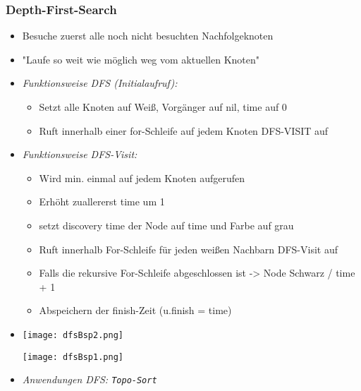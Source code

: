         \subsubsection{Depth-First-Search}
            \begin{itemize}
                \item Besuche zuerst alle noch nicht besuchten Nachfolgeknoten
                \item \string"Laufe so weit wie möglich weg vom aktuellen Knoten\string"
                \item \textit{Funktionsweise DFS (Initialaufruf):}
                    \begin{itemize}
                        \item Setzt alle Knoten auf Weiß, Vorgänger auf nil, time auf 0
                        \item Ruft innerhalb einer for-Schleife auf jedem Knoten DFS-VISIT auf
                    \end{itemize}
                \item \textit{Funktionsweise DFS-Visit:}
                    \begin{itemize}
                        \item Wird min. einmal auf jedem Knoten aufgerufen
                        \item Erhöht zuallererst time um 1
                        \item setzt discovery time der Node auf time und Farbe auf grau
                        \item Ruft innerhalb For-Schleife für jeden weißen Nachbarn DFS-Visit auf
                        \item Falls die rekursive For-Schleife abgeschlossen ist -> Node Schwarz / time + 1
                        \item Abspeichern der finish-Zeit (u.finish = time)
                    \end{itemize}
                \item[]
                    \begin{minipage}{0.3\textwidth}
                        \texttt{[image: dfsBsp2.png]}
                    \end{minipage}
                    \begin{minipage}{0.45\textwidth}
                        \texttt{[image: dfsBsp1.png]}
                    \end{minipage}
                \item \textit{Anwendungen DFS: \texttt{Topo-Sort}}

\end{itemize}
